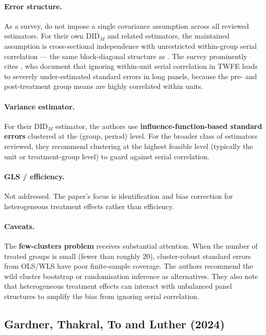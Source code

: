 \documentclass[12pt]{article}
\begin{document}
\paragraph{Error structure.}
As a survey, \citet{dechaisemartin2023twoway} do not impose a single covariance
assumption across all reviewed estimators.
For their own DID$_M$ and related estimators, the maintained assumption is
cross-sectional independence with unrestricted within-group serial correlation
--- the same block-diagonal structure as \citet{callaway2021difference}.
The survey prominently cites \citet{bertrand2004much}, who document that
ignoring within-unit serial correlation in TWFE leads to severely
under-estimated standard errors in long panels, because the pre- and
post-treatment group means are highly correlated within units.

\paragraph{Variance estimator.}
For their DID$_M$ estimator, the authors use \textbf{influence-function-based
standard errors} clustered at the (group, period) level.
For the broader class of estimators reviewed, they recommend clustering at the
highest feasible level (typically the unit or treatment-group level) to guard
against serial correlation.

\paragraph{GLS / efficiency.}
Not addressed.
The paper's focus is identification and bias correction for heterogeneous
treatment effects rather than efficiency.

\paragraph{Caveats.}
The \textbf{few-clusters problem} receives substantial attention.
When the number of treated groups is small (fewer than roughly 20),
cluster-robust standard errors from OLS/WLS have poor finite-sample coverage.
The authors recommend the wild cluster bootstrap or randomisation inference
as alternatives.
They also note that heterogeneous treatment effects can interact with
unbalanced panel structures to amplify the bias from ignoring serial
correlation.

\subsection{Gardner, Thakral, To and Luther (2024)}
\end{document}
